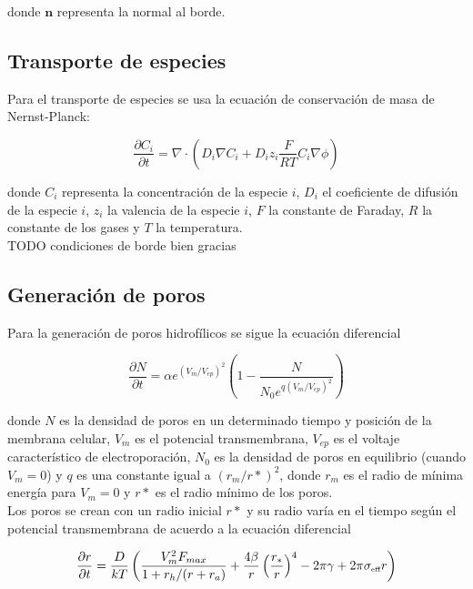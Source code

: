 \documentclass[a4paper,10pt]{article}
\begin{document}
donde $\mathbf{n}$ representa la normal al borde.

\subsection{Transporte de especies}
Para el transporte de especies se usa la ecuación de conservación de masa de Nernst-Planck:

\begin{equation} \label{eq:trans}
	\frac{\partial C_i}{\partial t} = \nabla \cdot \left( D_i \nabla C_i + D_i z_i \frac{F}{R T} C_i \nabla \phi \right)
\end{equation}

donde $C_i$ representa la concentración de la especie $i$, $D_i$ el coeficiente de difusión de la especie $i$, $z_i$ la valencia de la especie $i$, $F$ la constante de Faraday, $R$ la constante de los gases y $T$ la temperatura.\\

TODO condiciones de borde bien gracias

\subsection{Generación de poros}
Para la generación de poros hidrofílicos se sigue la ecuación diferencial 

\begin{equation} \label{eq:poros-crea}
	\frac{\partial N}{\partial t} = \alpha e^{(V_m/V_{ep})^2} \left( 1 - \frac{N}{N_0 e^{q \left(V_m/V_{ep} \right) ^2}} \right)
\end{equation}

donde $N$ es la densidad de poros en un determinado tiempo y posición de la membrana celular, $V_m$ es el potencial transmembrana, $V_{ep}$ es el voltaje característico de electroporación, $N_0$ es la densidad de poros en equilibrio (cuando $V_m = 0$) y $q$ es una constante igual a $(r_m / r*)^2$, donde $r_m$ es el radio de mínima energía para $V_m = 0$ y $r*$ es el radio mínimo de los poros.\\

Los poros se crean con un radio inicial $r*$ y su radio varía en el tiempo según el potencial transmembrana de acuerdo a la ecuación diferencial

\begin{equation} \label{eq:poros-radio}
	\frac{\partial r}{\partial t} = \frac{D}{kT} \left( \frac{V_m^2 F_{max}}{1+r_h / (r+r_a)} + \frac{4 \beta}{r} \left(\frac{r_*}{r}\right)^4 - 2 \pi \gamma + 2 \pi \sigma_{\textrm{\tiny eff}} r\right)
\end{equation}
\end{document}
